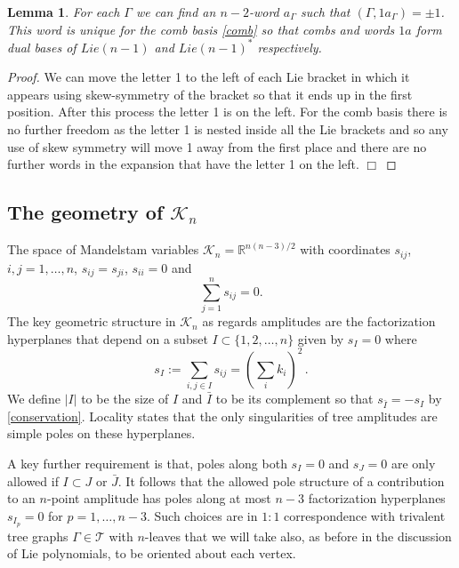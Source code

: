 \documentclass[11pt]{article}
\newcommand{\R}{\mathbb{R}}
\newcommand{\cK}{\mathcal{K}}
\newcommand{\cT}{\mathcal{T}}
\newcommand{\1}{{\rm 1\hskip-0.25em I}}
\newtheorem{lemma}{Lemma}[section]
\begin{document}
  \begin{lemma}
For each $\Gamma$ we can find an $n-2$-word $a_\Gamma$ such that $(\Gamma,1a_{\Gamma})=\pm 1$.  This word is unique for the comb basis \eqref{comb} so that combs and words $1a$ form dual bases of $Lie(n-1)$ and $Lie(n-1)^*$ respectively.
\end{lemma}
\begin{proof}
We can move the letter 1 to the left of each Lie bracket in which it appears using skew-symmetry of the bracket so that it ends up in the first position.  After this process the letter 1 is on the left.  For the comb  basis there is no further freedom as the letter 1 is nested inside all the Lie brackets and so any use of skew symmetry will move 1 away from the first place and there are no further words in the expansion that have the letter 1 on the left. $\Box$
\end{proof}


\subsection{The geometry of $\cK_n$}

The space of Mandelstam variables $\cK_n=\R^{n(n-3)/2}$ with coordinates $s_{ij}$, $i,j=1,\ldots , n$, $s_{ij}=s_{ji}$, $s_{ii}=0$ and 
\begin{equation}
\sum_{j=1}^n s_{ij} = 0. \label{conservation}
\end{equation}
The key geometric structure in $\cK_n$ as regards amplitudes are the factorization hyperplanes that depend on a subset $I\subset \{1,2,\ldots,n\}$ given by $s_I=0$ where\begin{equation}
s_I:=\sum_{i,j\in I} s_{ij}=\left(\sum_i k_i\right)^2\, .
\end{equation}
We define $|I|$ to be the size of $I$ and $\bar I$ to be its complement so that $s_{\bar I}=-s_I$ by \eqref{conservation}. Locality states that the only singularities of tree amplitudes are simple poles on these hyperplanes. 

A key further requirement is that, poles along both $s_I=0$ and $s_J=0$ are only allowed if $I\subset J$ or $\bar J$.
It follows that the allowed pole structure of a contribution to an $n$-point amplitude has poles along at most $n-3$ factorization hyperplanes $s_{I_p}=0$ for $p=1,\ldots ,n-3$.  Such choices are in $1:1$ correspondence with trivalent tree graphs $\Gamma\in \cT$  with $n$-leaves that we will take also, as before in the discussion of Lie polynomials, to be oriented about each vertex. 
\end{document}

